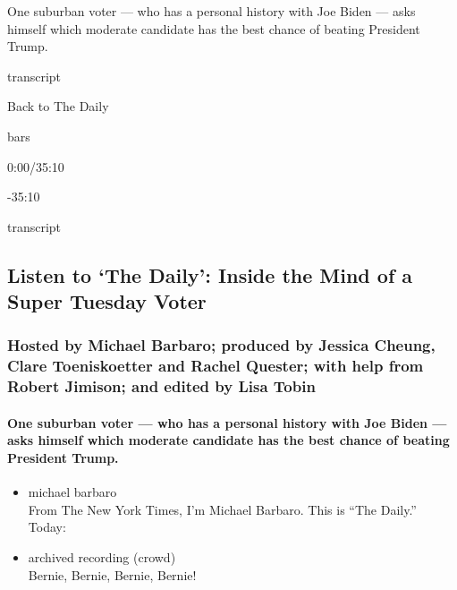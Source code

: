 One suburban voter --- who has a personal history with Joe Biden ---
asks himself which moderate candidate has the best chance of beating
President Trump.

transcript

Back to The Daily

bars

0:00/35:10

-35:10

transcript

\hypertarget{listen-to-the-daily-inside-the-mind-of-a-super-tuesday-voter-1}{%
\subsection{Listen to `The Daily': Inside the Mind of a Super Tuesday
Voter}\label{listen-to-the-daily-inside-the-mind-of-a-super-tuesday-voter-1}}

\hypertarget{hosted-by-michael-barbaro-produced-by-jessica-cheung-clare-toeniskoetter-and-rachel-quester-with-help-from-robert-jimison-and-edited-by-lisa-tobin}{%
\subsubsection{Hosted by Michael Barbaro; produced by Jessica Cheung,
Clare Toeniskoetter and Rachel Quester; with help from Robert Jimison;
and edited by Lisa
Tobin}\label{hosted-by-michael-barbaro-produced-by-jessica-cheung-clare-toeniskoetter-and-rachel-quester-with-help-from-robert-jimison-and-edited-by-lisa-tobin}}

\hypertarget{one-suburban-voter--who-has-a-personal-history-with-joe-biden--asks-himself-which-moderate-candidate-has-the-best-chance-of-beating-president-trump}{%
\paragraph{One suburban voter --- who has a personal history with Joe
Biden --- asks himself which moderate candidate has the best chance of
beating President
Trump.}\label{one-suburban-voter--who-has-a-personal-history-with-joe-biden--asks-himself-which-moderate-candidate-has-the-best-chance-of-beating-president-trump}}

\begin{itemize}
\item
  michael barbaro\\
  From The New York Times, I'm Michael Barbaro. This is ``The Daily.''
  Today:
\item
  archived recording (crowd)\\
  Bernie, Bernie, Bernie, Bernie!
\end{itemize}


